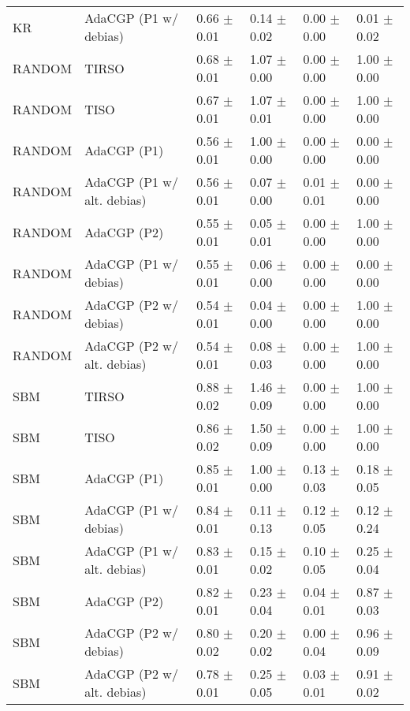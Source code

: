 \begin{tabular}{llllll}
KR     &       AdaCGP (P1 w/ debias) &  0.66 $\pm$ 0.01 &  0.14 $\pm$ 0.02 &  0.00 $\pm$ 0.00 &  0.01 $\pm$ 0.02 \\
RANDOM &                       TIRSO &  0.68 $\pm$ 0.01 &  1.07 $\pm$ 0.00 &  0.00 $\pm$ 0.00 &  1.00 $\pm$ 0.00 \\
RANDOM &                        TISO &  0.67 $\pm$ 0.01 &  1.07 $\pm$ 0.01 &  0.00 $\pm$ 0.00 &  1.00 $\pm$ 0.00 \\
RANDOM &                 AdaCGP (P1) &  0.56 $\pm$ 0.01 &  1.00 $\pm$ 0.00 &  0.00 $\pm$ 0.00 &  0.00 $\pm$ 0.00 \\
RANDOM &  AdaCGP (P1 w/ alt. debias) &  0.56 $\pm$ 0.01 &  0.07 $\pm$ 0.00 &  0.01 $\pm$ 0.01 &  0.00 $\pm$ 0.00 \\
RANDOM &                 AdaCGP (P2) &  0.55 $\pm$ 0.01 &  0.05 $\pm$ 0.01 &  0.00 $\pm$ 0.00 &  1.00 $\pm$ 0.00 \\
RANDOM &       AdaCGP (P1 w/ debias) &  0.55 $\pm$ 0.01 &  0.06 $\pm$ 0.00 &  0.00 $\pm$ 0.00 &  0.00 $\pm$ 0.00 \\
RANDOM &       AdaCGP (P2 w/ debias) &  0.54 $\pm$ 0.01 &  0.04 $\pm$ 0.00 &  0.00 $\pm$ 0.00 &  1.00 $\pm$ 0.00 \\
RANDOM &  AdaCGP (P2 w/ alt. debias) &  0.54 $\pm$ 0.01 &  0.08 $\pm$ 0.03 &  0.00 $\pm$ 0.00 &  1.00 $\pm$ 0.00 \\
SBM    &                       TIRSO &  0.88 $\pm$ 0.02 &  1.46 $\pm$ 0.09 &  0.00 $\pm$ 0.00 &  1.00 $\pm$ 0.00 \\
SBM    &                        TISO &  0.86 $\pm$ 0.02 &  1.50 $\pm$ 0.09 &  0.00 $\pm$ 0.00 &  1.00 $\pm$ 0.00 \\
SBM    &                 AdaCGP (P1) &  0.85 $\pm$ 0.01 &  1.00 $\pm$ 0.00 &  0.13 $\pm$ 0.03 &  0.18 $\pm$ 0.05 \\
SBM    &       AdaCGP (P1 w/ debias) &  0.84 $\pm$ 0.01 &  0.11 $\pm$ 0.13 &  0.12 $\pm$ 0.05 &  0.12 $\pm$ 0.24 \\
SBM    &  AdaCGP (P1 w/ alt. debias) &  0.83 $\pm$ 0.01 &  0.15 $\pm$ 0.02 &  0.10 $\pm$ 0.05 &  0.25 $\pm$ 0.04 \\
SBM    &                 AdaCGP (P2) &  0.82 $\pm$ 0.01 &  0.23 $\pm$ 0.04 &  0.04 $\pm$ 0.01 &  0.87 $\pm$ 0.03 \\
SBM    &       AdaCGP (P2 w/ debias) &  0.80 $\pm$ 0.02 &  0.20 $\pm$ 0.02 &  0.00 $\pm$ 0.04 &  0.96 $\pm$ 0.09 \\
SBM    &  AdaCGP (P2 w/ alt. debias) &  0.78 $\pm$ 0.01 &  0.25 $\pm$ 0.05 &  0.03 $\pm$ 0.01 &  0.91 $\pm$ 0.02 \\
\bottomrule
\end{tabular}

